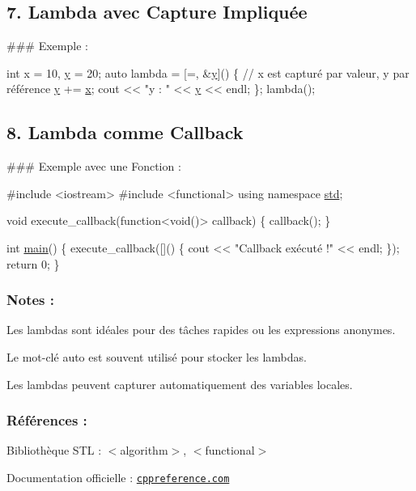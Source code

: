 \subsection*{7. Lambda avec Capture Impliquée}

\#\#\# Exemple \+: 
\begin{DoxyCode}
\textcolor{keywordtype}{int} x = 10, \hyperlink{addition_8c_a0a2f84ed7838f07779ae24c5a9086d33}{y} = 20;
\textcolor{keyword}{auto} lambda = [=, &\hyperlink{addition_8c_a0a2f84ed7838f07779ae24c5a9086d33}{y}]() \{
    \textcolor{comment}{// x est capturé par valeur, y par référence}
    \hyperlink{addition_8c_a0a2f84ed7838f07779ae24c5a9086d33}{y} += \hyperlink{addition_8c_a6150e0515f7202e2fb518f7206ed97dc}{x};
    cout << \textcolor{stringliteral}{"y : "} << \hyperlink{addition_8c_a0a2f84ed7838f07779ae24c5a9086d33}{y} << endl;
\};
lambda();
\end{DoxyCode}
 



\subsection*{8. Lambda comme Callback}

\#\#\# Exemple avec une Fonction \+: 
\begin{DoxyCode}
\textcolor{preprocessor}{#include <iostream>}
\textcolor{preprocessor}{#include <functional>}
\textcolor{keyword}{using namespace }\hyperlink{namespacestd}{std};

\textcolor{keywordtype}{void} execute\_callback(\textcolor{keyword}{function}<\textcolor{keywordtype}{void}()> callback) \{
    callback();
\}

\textcolor{keywordtype}{int} \hyperlink{htop_8c_a3c04138a5bfe5d72780bb7e82a18e627}{main}() \{
    execute\_callback([]() \{
        cout << \textcolor{stringliteral}{"Callback exécuté !"} << endl;
    \});
    \textcolor{keywordflow}{return} 0;
\}
\end{DoxyCode}
 



\subsubsection*{Notes \+:}


\begin{DoxyEnumerate}
\item Les lambdas sont idéales pour des tâches rapides ou les expressions anonymes.
\item Le mot-\/clé {\ttfamily auto} est souvent utilisé pour stocker les lambdas.
\item Les lambdas peuvent capturer automatiquement des variables locales. 


\end{DoxyEnumerate}

\subsubsection*{Références \+:}


\begin{DoxyItemize}
\item Bibliothèque S\+TL \+: {\ttfamily $<$algorithm$>$}, {\ttfamily $<$functional$>$}
\item Documentation officielle \+: \href{https://en.cppreference.com}{\tt cppreference.\+com} 
\end{DoxyItemize}